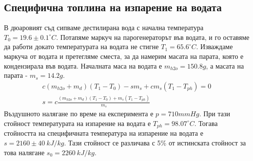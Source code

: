 \documentclass[
 reprint,
 amsmath,amssymb,
 aps,
]{revtex4-2}
\begin{document}
\subsection{Специфична топлина на изпарение на водата}
В дюаровият съд сипваме дестилирана вода с начална температура $T_0 = 19.6 \pm 0.1^{\circ}C$. Потапяме маркуч на парогенераторът във водата, и го оставяме да работи докато температурата на водата не стигне $T_1 = 65.6^{\circ}C$. Изваждаме маркуча от водата и претегляме сместа, за да намерим масата на парата, която е кондензирала във водата. Началната маса на водата е $m_{h2o}=150.8g$, а масата на парата - $m_s = 14.2g$. 
\begin{gather*}
    c(m_{h2o} + m_d)(T_1 - T_0) - s m_s + c m_s (T_1 - T_{ph}) = 0 \\
    s = c \frac{(m_{h2o} + m_d)(T_1 - T_0) + m_s (T_1 - T_{ph})}{m_s}
\end{gather*}
Въздушното налягане по време на експеримента е $p = 710 mmHg$. При тази стойност температурата на изпарение на водата е $T_{ph} = 98.07^{\circ}C$. Тогава стойността на специфичната температура на изпарение на водата е $s = 2160 \pm 40 \ kJ/kg$. Тази стойност се различава с 5\% от истинската стойност за това налягане $s_0 = 2260 \ kJ/kg$.
\end{document}
